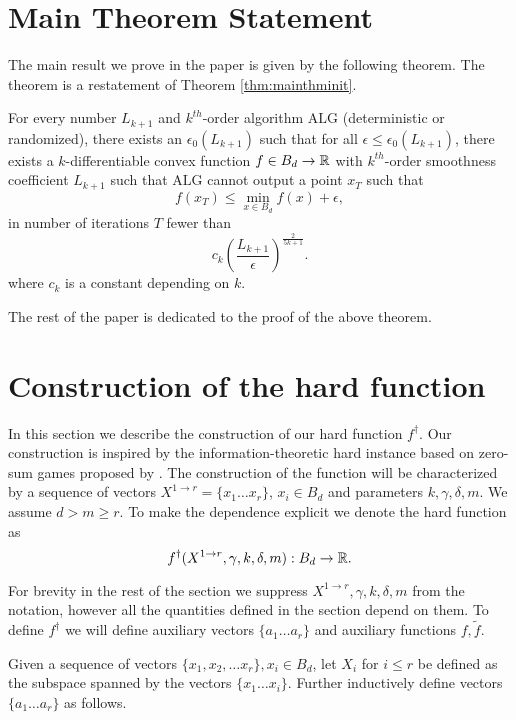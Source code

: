 \documentclass[final,12pt]{colt2018} %
\def\hardf{f^{\dagger}}
\def\alg{\mathrm{ALG}}
\begin{document}
\section{Main Theorem Statement}
\label{sec:mainthmstatement}
The main result we prove in the paper is given by the following theorem. The theorem is a restatement of Theorem \ref{thm:mainthminit}. 

\begin{theorem}
\label{thm:mainthmprecise}
For every number $L_{k+1}$ and $k^{th}$-order algorithm $\alg$ (deterministic or randomized), there exists an $\epsilon_0(L_{k+1})$ such that for all $\epsilon \leq \epsilon_0(L_{k+1})$, there exists a $k$-differentiable convex function $f \in B_d \rightarrow {\mathbb R}$ with $k^{th}$-order smoothness coefficient $L_{k+1}$ such that $\alg$ cannot output a point $x_T$ such that
\[f(x_T) \leq \min_{x \in B_d} f(x) + \epsilon,\]
 in number of iterations $T$ fewer than
\[ c_k\left(\frac{L_{k+1}}{\epsilon}\right)^{\frac{2}{5k + 1} }.\]
where $c_k$ is a constant depending on $k$.
\end{theorem}
The rest of the paper is dedicated to the proof of the above theorem. 


\section{Construction of the hard function}

\label{sec:construction}

In this section we describe the construction of our hard function $\hardf$. Our construction is inspired by the information-theoretic hard instance based on zero-sum games proposed by \cite{ClarksonHW2012}. The construction of the function will be characterized by a sequence of vectors $X^{1 \rightarrow r} = \{x_1 \ldots x_r\}$, $x_i \in B_d$ and parameters $k,\gamma, \delta, m$. We assume $d > m \geq r$. To make the dependence explicit we denote the hard function as  \[\hardf(X^{1 \rightarrow r},\gamma,k,\delta, m):B_d \rightarrow \reals.\]

For brevity in the rest of the section we suppress $X^{1 \rightarrow r}, \gamma, k, \delta, m$ from the notation, however all the quantities defined in the section depend on them. To define $\hardf$ we will define auxiliary vectors $\{a_1 \ldots a_r\}$ and auxiliary functions $f,\tilde{f}$. 

Given a sequence of vectors $\{x_1, x_2, \ldots x_r\}, x_i \in B_d$, let $X_i$ for $i \leq r$ be defined as the subspace spanned by the vectors $\{x_1 \ldots x_{i}\}$. Further inductively define vectors $\{a_1 \ldots a_r\}$ as follows.
\end{document}
